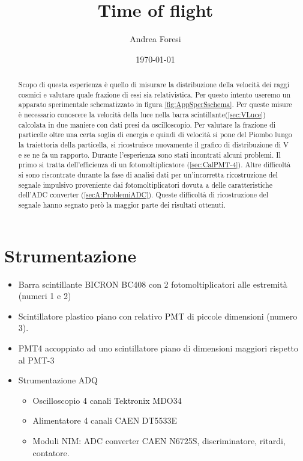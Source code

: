 \documentclass[a4paper]{article}
\title{Time of flight}
\author{Andrea Foresi}
\date{\today}
\begin{document}
\maketitle
\tableofcontents



\begin{abstract}
Scopo di questa esperienza è quello di misurare la distribuzione della velocità dei raggi cosmici e valutare quale frazione di essi sia relativistica. Per questo intento useremo un apparato sperimentale schematizzato in figura \ref{fig:AppSperSschema}. Per queste misure è necessario conoscere la velocità della luce nella barra scintillante(\ref{sec:VLuce}) calcolata in due maniere con dati presi da oscilloscopio. Per valutare la frazione di particelle oltre una certa soglia di energia e quindi di velocità si pone del Piombo lungo la traiettoria della particella, si ricostruisce nuovamente il grafico di distribuzione di V e se ne fa un rapporto. Durante l'esperienza sono stati incontrati alcuni problemi. Il primo si tratta dell'efficienza di un fotomoltiplicatore (\ref{sec:CalPMT-4}). Altre difficoltà si sono riscontrate durante la fase di analisi dati per un'incorretta ricostruzione del segnale impulsivo proveniente dai fotomoltiplicatori dovuta a delle caratteristiche dell'ADC converter (\ref{secA:ProblemiADC}). Queste difficoltà di ricostruzione del segnale hanno segnato però la maggior parte dei risultati ottenuti.
\end{abstract}


\section{Strumentazione}
\label{sec:AppSper}
\begin{itemize}
\item Barra scintillante BICRON BC408 con 2 fotomoltiplicatori alle estremità (numeri 1 e 2)
\item Scintillatore plastico piano con relativo PMT di piccole dimensioni (numero 3). 
\item PMT4 accoppiato ad uno scintillatore piano di dimensioni maggiori rispetto al PMT-3
\item Strumentazione ADQ
\begin{itemize}
    \item Oscilloscopio 4 canali Tektronix MDO34
    \item Alimentatore 4 canali CAEN DT5533E
    \item Moduli NIM: ADC converter CAEN N6725S, discriminatore, ritardi, contatore.
\end{itemize}
\end{itemize}
\end{document}

